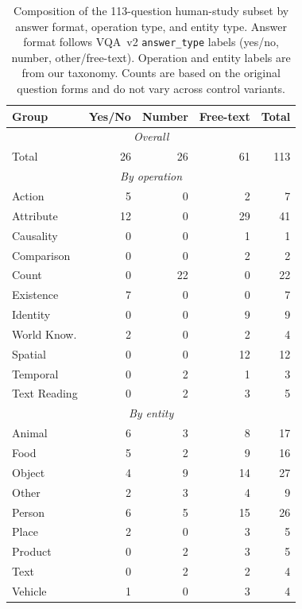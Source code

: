 \begin{table}[h]
\centering
\small
\setlength{\tabcolsep}{5pt}
\begin{tabular}{lrrrr}
\toprule
Group & Yes/No & Number & Free-text & Total \\
\midrule
\multicolumn{5}{c}{\textit{Overall}} \\
\midrule
Total & 26 & 26 & 61 & 113 \\
\midrule
\multicolumn{5}{c}{\textit{By operation}} \\
\midrule
Action & 5 & 0 & 2 & 7 \\
Attribute & 12 & 0 & 29 & 41 \\
Causality & 0 & 0 & 1 & 1 \\
Comparison & 0 & 0 & 2 & 2 \\
Count & 0 & 22 & 0 & 22 \\
Existence & 7 & 0 & 0 & 7 \\
Identity & 0 & 0 & 9 & 9 \\
World Know. & 2 & 0 & 2 & 4 \\
Spatial & 0 & 0 & 12 & 12 \\
Temporal & 0 & 2 & 1 & 3 \\
Text Reading & 0 & 2 & 3 & 5 \\
\midrule
\multicolumn{5}{c}{\textit{By entity}} \\
\midrule
Animal & 6 & 3 & 8 & 17 \\
Food & 5 & 2 & 9 & 16 \\
Object & 4 & 9 & 14 & 27 \\
Other & 2 & 3 & 4 & 9 \\
Person & 6 & 5 & 15 & 26 \\
Place & 2 & 0 & 3 & 5 \\
Product & 0 & 2 & 3 & 5 \\
Text & 0 & 2 & 2 & 4 \\
Vehicle & 1 & 0 & 3 & 4 \\
\bottomrule
\end{tabular}
\caption{Composition of the 113-question human-study subset by answer format, operation type, and entity type. Answer format follows VQA~v2 \texttt{answer\_type} labels (yes/no, number, other/free-text). Operation and entity labels are from our taxonomy. Counts are based on the original question forms and do not vary across control variants.}
\label{tab:q113_sample_composition}
\end{table}
